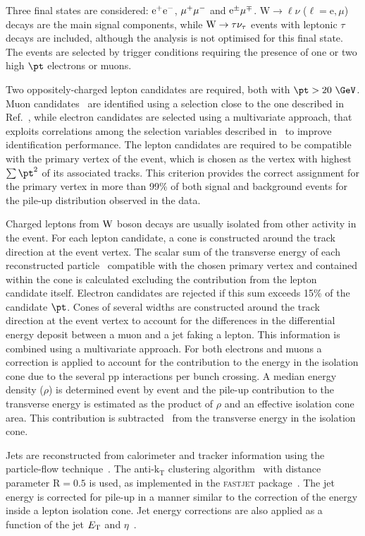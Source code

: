 Three final states are considered:
$\mathrm{\mathrm{e}}^{+}\mathrm{\mathrm{e}}^{-}$, $\mu^{+}\mu^{-}$ and $\mathrm{\mathrm{e}}^{\pm}\mu^{\mp}$.
W$\to \ell \nu$ ($\ell = \mathrm{e},\mu$) decays are the main signal
components, while $\mathrm{W}\to\tau\nu_{\tau}$ events with leptonic $\tau$
decays are included, although the analysis is not optimised for this final state.
The events are selected by trigger conditions requiring
the presence of one or two high $\pt$ electrons or muons.

Two oppositely-charged lepton candidates are required, both with $\pt > 20~\GeV$.
Muon candidates~\cite{muonpas} are identified using a selection close to
the one described in Ref.~\cite{Chatrchyan:2011tz}, while
electron candidates are selected using a multivariate
approach, that exploits correlations among the selection variables
described in~\cite{egmpas} to improve identification performance. 
The lepton candidates are required to be compatible with the primary vertex of the
event, which is chosen as the vertex with highest $\sum \pt^2$ of its associated tracks. 
This criterion provides the correct assignment for the
primary vertex in more than 99\% of both signal and
background events for the pile-up distribution observed in the data. 

Charged leptons from $\mathrm{W}$ boson decays are usually isolated
from other activity in the event. For each lepton candidate, a cone
is constructed around the track direction at the event vertex.  The scalar
sum of the transverse energy of each reconstructed
particle~\cite{PFT-09-001} compatible with the
chosen primary vertex and contained within the cone is calculated
excluding the contribution from the lepton candidate itself. Electron candidates
are rejected if this sum exceeds 15\% of the candidate $\pt$.
Cones of several widths are constructed around the track direction at the event vertex 
to account for the differences in the differential energy deposit between a muon and a jet 
faking a lepton. This information is combined using a multivariate approach.
For both electrons and muons a correction is applied to account for the contribution to 
the energy in the isolation cone due to the several pp interactions per bunch crossing.
A median energy density ($\rho$) is determined event by event and the pile-up contribution to 
the transverse energy is estimated as the product of $\rho$ and an effective isolation cone area. 
This contribution is  subtracted~\cite{Cacciari:subtraction} from the transverse energy in the 
isolation cone.

Jets are reconstructed from calorimeter and tracker information using
the particle-flow technique~\cite{PFT-09-001,jetpas}. The anti-$\mathrm{k_T}$
clustering algorithm~\cite{antikt} with distance parameter $\mathrm{
R}=0.5$ is used, as implemented in the \textsc{fastjet}
package~\cite{Cacciari:fastjet1,Cacciari:fastjet2}. The jet energy is corrected
for pile-up in a manner similar to the correction of the energy inside a lepton
isolation cone. Jet energy corrections are also applied as a function of the jet
$E_\mathrm{T}$ and $\eta$~\cite{cmsJEC}. 

